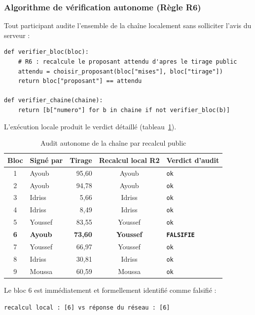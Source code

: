\documentclass[11pt,a4paper]{article}
\begin{document}
\subsubsection*{Algorithme de vérification autonome (Règle R6)}
Tout participant audite l'ensemble de la chaîne localement sans solliciter l'avis du serveur :

\begin{lstlisting}
def verifier_bloc(bloc):
    # R6 : recalcule le proposant attendu d'apres le tirage public
    attendu = choisir_proposant(bloc["mises"], bloc["tirage"])
    return bloc["proposant"] == attendu

def verifier_chaine(chaine):
    return [b["numero"] for b in chaine if not verifier_bloc(b)]
\end{lstlisting}

L'exécution locale produit le verdict détaillé (tableau~\ref{tab:audit_fraude}).

\begin{table}[H]
\centering
\small
\begin{tabular}{@{}clrcl@{}}
\toprule
\textbf{Bloc} & \textbf{Signé par} & \textbf{Tirage} & \textbf{Recalcul local R2} & \textbf{Verdict d'audit} \\
\midrule
1 & Ayoub   & 95,60 & Ayoub   & \texttt{ok} \\
2 & Ayoub   & 94,78 & Ayoub   & \texttt{ok} \\
3 & Idriss  &  5,66 & Idriss  & \texttt{ok} \\
4 & Idriss  &  8,49 & Idriss  & \texttt{ok} \\
5 & Youssef & 83,55 & Youssef & \texttt{ok} \\
\textbf{6} & \textbf{Ayoub} & \textbf{73,60} & \textbf{Youssef} & \textbf{\texttt{FALSIFIE}} \\
7 & Youssef & 66,97 & Youssef & \texttt{ok} \\
8 & Idriss  & 30,81 & Idriss  & \texttt{ok} \\
9 & Moussa  & 60,59 & Moussa  & \texttt{ok} \\
\bottomrule
\end{tabular}
\caption{Audit autonome de la chaîne par recalcul public}
\label{tab:audit_fraude}
\end{table}

Le bloc 6 est immédiatement et formellement identifié comme falsifié :
\begin{center}
\texttt{recalcul local : [6] \quad vs \quad réponse du réseau : [6]}
\end{center}
\end{document}
